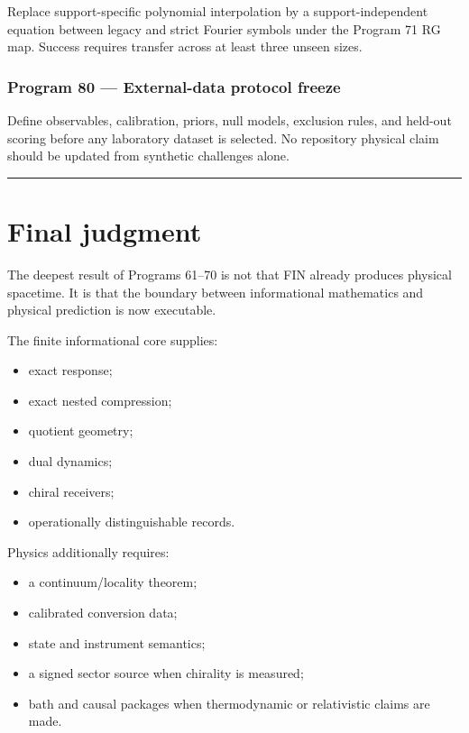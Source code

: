 \documentclass[11pt,a4paper,openany]{report}
\begin{document}
Replace support-specific polynomial interpolation by a support-independent equation between legacy and strict Fourier symbols under the Program 71 RG map. Success requires transfer across at least three unseen sizes.

\subsection{Program 80 — External-data protocol freeze}

Define observables, calibration, priors, null models, exclusion rules, and held-out scoring before any laboratory dataset is selected. No repository physical claim should be updated from synthetic challenges alone.

\par\medskip\hrule\medskip

\chapter{Final judgment}

The deepest result of Programs 61–70 is not that FIN already produces physical spacetime. It is that the boundary between informational mathematics and physical prediction is now executable.

The finite informational core supplies:

\begin{itemize}
\item 
exact response;

\item 
exact nested compression;

\item 
quotient geometry;

\item 
dual dynamics;

\item 
chiral receivers;

\item 
operationally distinguishable records.

\end{itemize}

Physics additionally requires:

\begin{itemize}
\item 
a continuum/\allowbreak{}locality theorem;

\item 
calibrated conversion data;

\item 
state and instrument semantics;

\item 
a signed sector source when chirality is measured;

\item 
bath and causal packages when thermodynamic or relativistic claims are made.

\end{itemize}
\end{document}

